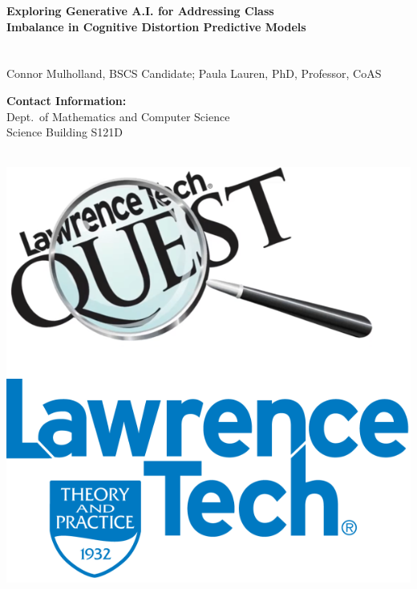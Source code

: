 \documentclass[a0,landscape]{a0poster}
\begin{document}
\begin{minipage}[b]{0.55\linewidth}
\veryHuge \color{DarkOrange} \textbf{Exploring Generative A.I. for Addressing Class \\ Imbalance in Cognitive Distortion Predictive Models} 
\\
\color{Black}\\ %
\huge\\Connor Mulholland, BSCS Candidate; Paula Lauren, PhD, Professor, CoAS %

\end{minipage}
%
\begin{minipage}[b]{0.25\linewidth}
\color{DarkSlateGray}\Large \textbf{Contact Information:}\\
Dept.\ of Mathematics and Computer Science\\ %
Science Building S121D\\
\\

\end{minipage}
%
\begin{minipage}[b]{0.18\linewidth}
\hspace{2cm}\includegraphics[width=15cm]{figures/QuestLTU1.png} %
\end{minipage}
\end{document}
